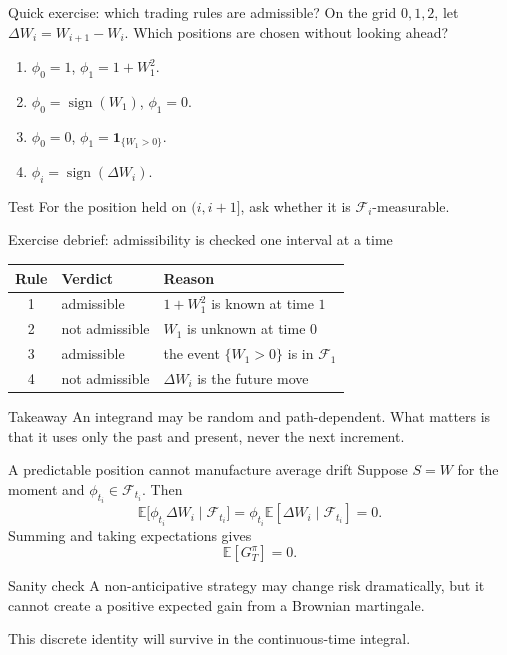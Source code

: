 \documentclass[handout,10pt,aspectratio=169]{beamer}
\newcommand{\E}{\mathbb E}
\newcommand{\F}{\mathcal F}
\begin{document}
\begin{frame}{Quick exercise: which trading rules are admissible?}
On the grid \(0,1,2\), let \(\Delta W_i=W_{i+1}-W_i\). Which positions are chosen without looking ahead?
\begin{enumerate}\setlength{\itemsep}{0.75em}
  \item \(\phi_0=1\), \(\phi_1=1+W_1^2\).
  \item \(\phi_0=\operatorname{sign}(W_1)\), \(\phi_1=0\).
  \item \(\phi_0=0\), \(\phi_1=\mathbf 1_{\{W_1>0\}}\).
  \item \(\phi_i=\operatorname{sign}(\Delta W_i)\).
\end{enumerate}
\begin{block}{Test}
For the position held on \((i,i+1]\), ask whether it is \(\F_i\)-measurable.
\end{block}
\end{frame}

\begin{frame}{Exercise debrief: admissibility is checked one interval at a time}
\begin{center}
\begin{tabular}{cll}
\toprule
Rule & Verdict & Reason \\
\midrule
1 & admissible & \(1+W_1^2\) is known at time \(1\) \\
2 & not admissible & \(W_1\) is unknown at time \(0\) \\
3 & admissible & the event \(\{W_1>0\}\) is in \(\F_1\) \\
4 & not admissible & \(\Delta W_i\) is the future move \\
\bottomrule
\end{tabular}
\end{center}
\begin{block}{Takeaway}
An integrand may be random and path-dependent. What matters is that it uses only the past and present, never the next increment.
\end{block}
\end{frame}

\begin{frame}{A predictable position cannot manufacture average drift}
Suppose \(S=W\) for the moment and \(\phi_{t_i}\in\F_{t_i}\). Then
\[
\E\bigl[\phi_{t_i}\Delta W_i\mid\F_{t_i}\bigr]
=\phi_{t_i}\E[\Delta W_i\mid\F_{t_i}]=0.
\]
Summing and taking expectations gives
\[
\E[G_T^\pi]=0.
\]
\begin{block}{Sanity check}
A non-anticipative strategy may change risk dramatically, but it cannot create a positive expected gain from a Brownian martingale.
\end{block}
This discrete identity will survive in the continuous-time integral.
\end{frame}
\end{document}
